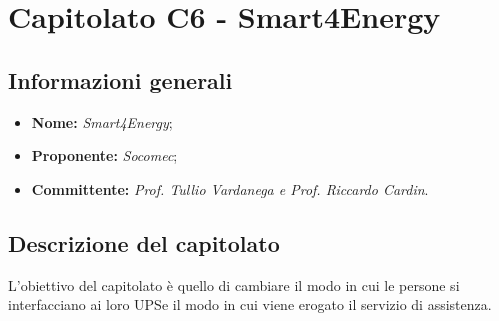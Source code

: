 \section{Capitolato C6 - Smart4Energy}\label{section:c6}

\subsection{Informazioni generali}
	\begin {itemize}
		\item \textbf{Nome:} \textit{Smart4Energy};
		\item \textbf{Proponente:} \textit{Socomec};
		\item \textbf{Committente:} \textit{Prof. Tullio Vardanega e Prof. Riccardo Cardin}.
	\end{itemize}

	\subsection{Descrizione del capitolato}
		L’obiettivo del capitolato è quello di cambiare il modo in cui le persone si interfacciano ai loro UPS\glo e il modo in cui viene erogato il servizio di assistenza.
		

